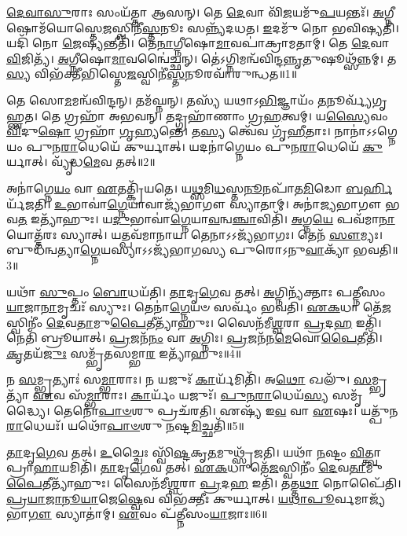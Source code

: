 \setcounter{anuvakam}{0}

\-\ul{𑌦𑍇}\-\-\ul{𑌵𑌾}\-\-\ul{𑌸𑍁}\-𑌰𑌾𑌃 𑌸𑌂𑌯᳴𑌤𑍍𑌤𑌾 𑌆𑌸𑌨𑍍।
𑌤𑍇 \ul{𑌦𑍇}\-𑌵𑌾 𑌵𑌿᳴\-\ul{𑌜}\-𑌯𑌮𑍁᳴\-\ul{𑌪}\-𑌯𑌨𑍍𑌤𑌃᳴।
\-\ul{𑌅}\-𑌗𑍍𑌨𑍀𑌷𑍋𑌮᳴𑌯𑍋𑌸𑍍𑌤𑍇\-\ul{𑌜}\-𑌸𑍍𑌵𑌿𑌨𑍀॑\-\ul{𑌸𑍍𑌤}\-𑌨𑍂𑌃 𑌸𑌨𑍍𑌨𑍍𑌯᳴𑌦𑌧𑌤।
\-\ul{𑌇}\-𑌦𑌮𑍁᳴ 𑌨𑍋 𑌭𑌵𑌿𑌷𑍍𑌯𑌤𑌿।
𑌯𑌦𑌿᳴ 𑌨𑍋 \ul{𑌜𑍇}\-𑌷𑍍𑌯𑌨𑍍𑌤𑍀𑌤𑌿᳴।
𑌤𑍇\-\ul{𑌨𑌾}\-𑌗𑍍𑌨𑍀𑌷𑍋\-\ul{𑌮𑌾}\-𑌵𑌪𑌾॑𑌕𑍍𑌰𑌾𑌮𑌤𑌾𑌮𑍍।
𑌤𑍇 \ul{𑌦𑍇}\-𑌵𑌾 \ul{𑌵𑌿}\-𑌜𑌿𑌤𑍍𑌯᳴।
\-\ul{𑌅}\-𑌗𑍍𑌨𑍀𑌷𑍋\-\ul{𑌮𑌾}\-𑌵𑌨𑍍𑌵𑍈॑𑌚𑍍𑌛𑌨𑍍।
𑌤𑍇॑𑌽𑌗𑍍𑌨𑌿𑌮𑌨𑍍𑌵᳴\-𑌵𑌿𑌨𑍍𑌦\-\ul{𑌨𑍍𑌨𑍃}\-𑌤𑍁𑌷𑍂𑌥𑍍𑌸᳴𑌨𑍍𑌨𑌮𑍍।
𑌤\-\ul{𑌸𑍍𑌯} 𑌵𑌿𑌭᳴𑌕𑍍𑌤𑍀𑌭𑌿𑌸𑍍𑌤𑍇\-\ul{𑌜}\-𑌸𑍍𑌵𑌿𑌨𑍀॑\-\ul{𑌸𑍍𑌤}\-𑌨𑍂\-𑌰𑌵𑌾᳴𑌰𑍁𑌨𑍍𑌧𑌤॥1॥

𑌤𑍇 𑌸𑍋\-\ul{𑌮}\-𑌮𑌨𑍍𑌵᳴𑌵𑌿𑌨𑍍𑌦𑌨𑍍।
𑌤𑌮᳴𑌘𑍍𑌨𑌨𑍍।
𑌤𑌸𑍍𑌯᳴ 𑌯𑌥𑌾\-𑌽\-\ul{𑌭𑌿}\-𑌜𑍍𑌞𑌾𑌯𑌂᳴ \ul{𑌤}\-𑌨𑍂𑌰𑍍𑌵𑍍𑌯᳴𑌗𑍃𑌹𑍍𑌣𑌤।
𑌤𑍇 𑌗𑍍𑌰𑌹𑌾᳴ 𑌅𑌭𑌵𑌨𑍍।
𑌤𑌦𑍍𑌗𑍍𑌰𑌹𑌾᳴𑌣𑌾𑌂 𑌗𑍍𑌰\-\ul{𑌹}\-𑌤𑍍𑌵𑌮𑍍।
𑌯\-\ul{𑌸𑍍𑌯𑍈}\-𑌵𑌂 \ul{𑌵𑌿}\-𑌦𑍁\-\ul{𑌷𑍋} 𑌗𑍍𑌰𑌹𑌾᳴ \ul{𑌗𑍃}\-𑌹𑍍𑌯𑌨𑍍𑌤𑍇॑।
𑌤\-\ul{𑌸𑍍𑌯} 𑌤𑍍𑌵𑍇᳴𑌵 𑌗𑍃᳴\-\ul{𑌹𑍀}\-𑌤𑌾𑌃।
𑌨𑌾𑌨𑌾॑\-𑌽𑌽𑌗𑍍𑌨𑍇𑌯𑌂 𑌪𑍁𑌨\-\ul{𑌰𑌾}\-𑌧𑍇𑌯𑍇᳴ 𑌕𑍁𑌰𑍍𑌯𑌾𑌤𑍍।
𑌯𑌦𑌨𑌾॑𑌗𑍍𑌨𑍇𑌯𑌂 𑌪𑍁𑌨\-\ul{𑌰𑌾}\-𑌧𑍇𑌯𑍇᳴ \ul{𑌕𑍁}\-𑌰𑍍𑌯𑌾𑌤𑍍।
𑌵𑍍𑌯𑍃᳴𑌦𑍍𑌧\-\ul{𑌮𑍇}\-𑌵 𑌤𑌤𑍍॥2॥

𑌅𑌨𑌾॑𑌗𑍍𑌨𑍇\-\ul{𑌯𑌂} 𑌵𑌾 \ul{𑌏}\-𑌤𑌤𑍍𑌕𑍍𑌰𑌿᳴𑌯𑌤𑍇।
𑌯\-\ul{𑌥𑍍𑌸}\-𑌮𑌿\-\ul{𑌧}\-𑌸𑍍𑌤\-\ul{𑌨𑍂}\-𑌨𑌪𑌾᳴𑌤\-\ul{𑌮𑌿}\-𑌡𑍋 \ul{𑌬}\-\-\ul{𑌰𑍍}\-\mbox{}𑌹𑌿𑌰𑍍𑌯᳴𑌜𑌤𑌿।
\-\ul{𑌉}\-𑌭𑌾𑌵𑌾॑\-\ul{𑌗𑍍𑌨𑍇}\-𑌯𑌾𑌵𑌾𑌜𑍍𑌯᳴𑌭𑌾𑌗𑍗 𑌸𑍍𑌯𑌾𑌤𑌾𑌮𑍍।
𑌅𑌨𑌾॑𑌜𑍍𑌯𑌭𑌾𑌗𑍗 𑌭𑌵\-\ul{𑌤} 𑌇𑌤𑍍𑌯𑌾᳴𑌹𑍁𑌃।
𑌯\-\ul{𑌦𑍁}\-𑌭𑌾𑌵𑌾॑\-\ul{𑌗𑍍𑌨𑍇}\-𑌯𑌾\-\ul{𑌵}\-𑌨𑍍𑌵\-\ul{𑌞𑍍𑌚𑌾}\-𑌵𑌿𑌤𑌿᳴।
\-\ul{𑌅}\-𑌗𑍍𑌨\-\ul{𑌯𑍇} 𑌪𑌵᳴𑌮𑌾\-\ul{𑌨𑌾}\-𑌯𑍋𑌤𑍍𑌤᳴𑌰𑌃 𑌸𑍍𑌯𑌾𑌤𑍍।
𑌯𑌤𑍍𑌪𑌵᳴𑌮𑌾𑌨𑌾𑌯।
𑌤𑍇𑌨𑌾𑌽𑌽𑌜𑍍𑌯᳴𑌭𑌾𑌗𑌃।
𑌤𑍇𑌨᳴ \ul{𑌸𑍗}\-𑌮𑍍𑌯𑌃।
𑌬𑍁𑌧᳴𑌨𑍍𑌵𑌤𑍍𑌯𑌾\-\ul{𑌗𑍍𑌨𑍇}\-𑌯𑌸𑍍𑌯𑌾𑌽𑌽𑌜𑍍𑌯᳴𑌭𑌾𑌗𑌸𑍍𑌯 𑌪𑍁𑌰𑍋\-𑌽𑌨𑍁\-\ul{𑌵𑌾}\-𑌕𑍍𑌯𑌾᳴ 𑌭𑌵𑌤𑌿॥3॥

𑌯𑌥𑌾᳴ \ul{𑌸𑍁}\-𑌪𑍍𑌤𑌂 \ul{𑌬𑍋}\-𑌧𑌯᳴𑌤𑌿।
\-\ul{𑌤𑌾}\-𑌦𑍃\-\ul{𑌗𑍇}\-𑌵 𑌤𑌤𑍍।
\-\ul{𑌅}\-𑌗𑍍𑌨𑌿𑌨𑍍𑌯᳴𑌕𑍍𑌤𑌾𑌃 𑌪𑌤𑍍𑌨𑍀𑌸𑌂\-\ul{𑌯𑌾}\-𑌜𑌾\-\ul{𑌨𑌾}\-𑌮𑍃𑌚𑌃᳴ 𑌸𑍍𑌯𑍁𑌃।
𑌤𑍇𑌨𑌾॑\-\ul{𑌗𑍍𑌨𑍇}\-𑌯𑍞 𑌸𑌰𑍍𑌵𑌂᳴ 𑌭𑌵𑌤𑌿।
\-\ul{𑌏}\-\-\ul{𑌕}\-𑌧𑌾 𑌤𑍇᳴\-\ul{𑌜}\-𑌸𑍍𑌵𑌿𑌨𑍀𑌂॑ \ul{𑌦𑍇}\-𑌵\-\ul{𑌤𑌾}\-𑌮𑍁\-\ul{𑌪𑍈}\-𑌤𑍀𑌤𑍍𑌯𑌾᳴𑌹𑍁𑌃।
𑌸𑍈𑌨᳴𑌮𑍀\-\ul{𑌶𑍍𑌵}\-𑌰𑌾 \ul{𑌪𑍍𑌰}\-𑌦\-\ul{𑌹} 𑌇𑌤𑌿᳴।
𑌨𑍇𑌤𑌿᳴ 𑌬𑍍𑌰𑍂𑌯𑌾𑌤𑍍।
\-\ul{𑌪𑍍𑌰}\-𑌜𑌨᳴\-\ul{𑌨𑌂} 𑌵𑌾 \ul{𑌅}\-𑌗𑍍𑌨𑌿𑌃।
\-\ul{𑌪𑍍𑌰}\-𑌜𑌨᳴𑌨\-\ul{𑌮𑍇}\-𑌵𑍋\-\ul{𑌪𑍈}\-𑌤𑍀𑌤𑌿᳴।
\-\ul{𑌕𑍃}\-𑌤𑌯᳴\-\ul{𑌜𑍁𑌃} 𑌸𑌮𑍍𑌭𑍃᳴𑌤𑌸𑌮𑍍𑌭𑌾\-\ul{𑌰} 𑌇𑌤𑍍𑌯𑌾᳴𑌹𑍁𑌃॥4॥

𑌨 \ul{𑌸}\-𑌮𑍍𑌭𑍃𑌤𑍍𑌯𑌾𑌃॑ 𑌸\-\ul{𑌮𑍍𑌭𑌾}\-𑌰𑌾𑌃।
𑌨 𑌯𑌜𑍁𑌃᳴ \ul{𑌕𑌾}\-𑌰𑍍𑌯᳴𑌮𑌿𑌤𑌿᳴।
𑌅\-\ul{𑌥𑍋} 𑌖𑌲𑍁᳴।
\-\ul{𑌸}\-𑌮𑍍𑌭𑍃𑌤𑍍𑌯𑌾᳴ \ul{𑌏}\-𑌵 𑌸᳴\-\ul{𑌮𑍍𑌭𑌾}\-𑌰𑌾𑌃।
\-\ul{𑌕𑌾}\-𑌰𑍍𑌯𑌂᳴ 𑌯𑌜𑍁𑌃᳴।
\-\ul{𑌪𑍁}\-\-\ul{𑌨}\-\-\ul{𑌰𑌾}\-𑌧𑍇𑌯᳴\-\ul{𑌸𑍍𑌯} 𑌸𑌮𑍃᳴𑌦𑍍𑌧𑍍𑌯𑍈।
𑌤𑍇𑌨𑍋᳴\-\ul{𑌪𑌾}\-\-\ul{𑍞}\-𑌶𑍁 𑌪𑍍𑌰𑌚᳴𑌰𑌤𑌿।
𑌏𑌷𑍍𑌯᳴ 𑌇\-\ul{𑌵} 𑌵𑌾 \ul{𑌏}\-𑌷𑌃।
𑌯𑌤𑍍𑌪𑍁᳴𑌨\-\ul{𑌰𑌾}\-𑌧𑍇𑌯𑌃᳴।
𑌯𑌥𑍋᳴\-\ul{𑌪𑌾}\-\-\ul{𑍞}\-𑌶𑍁 \ul{𑌨}\-𑌷𑍍𑌟\-\ul{𑌮𑌿}\-𑌚𑍍𑌛𑌤𑌿᳴॥5॥

\-\ul{𑌤𑌾}\-𑌦𑍃\-\ul{𑌗𑍇}\-𑌵 𑌤𑌤𑍍।
\-\ul{𑌉}\-𑌚𑍍𑌚𑍈𑌃 𑌸𑍍𑌵𑌿᳴\-\ul{𑌷𑍍𑌟}\-𑌕𑍃\-\ul{𑌤}\-𑌮𑍁𑌥𑍍𑌸𑍃᳴𑌜𑌤𑌿।
𑌯𑌥𑌾᳴ \ul{𑌨}\-𑌷𑍍𑌟𑌂 \ul{𑌵𑌿}\-𑌤𑍍𑌤𑍍𑌵𑌾 𑌪𑍍𑌰𑌾\-\ul{𑌹𑌾}\-𑌯𑌮𑌿𑌤𑌿᳴।
\-\ul{𑌤𑌾}\-𑌦𑍃\-\ul{𑌗𑍇}\-𑌵 𑌤𑌤𑍍।
\-\ul{𑌏}\-\-\ul{𑌕}\-𑌧𑌾 𑌤𑍇᳴\-\ul{𑌜}\-𑌸𑍍𑌵𑌿𑌨𑍀𑌂॑ \ul{𑌦𑍇}\-𑌵\-\ul{𑌤𑌾}\-𑌮𑍁\-\ul{𑌪𑍈}\-𑌤𑍀𑌤𑍍𑌯𑌾᳴𑌹𑍁𑌃।
𑌸𑍈𑌨᳴𑌮𑍀\-\ul{𑌶𑍍𑌵}\-𑌰𑌾 \ul{𑌪𑍍𑌰}\-𑌦\-\ul{𑌹} 𑌇𑌤𑌿᳴।
𑌤𑌤𑍍𑌤\-\ul{𑌥𑌾} 𑌨𑍋𑌪𑍈᳴𑌤𑌿।
\-\ul{𑌪𑍍𑌰}\-\-\ul{𑌯𑌾}\-\-\ul{𑌜𑌾}\-\-\ul{𑌨𑍂}\-\-\ul{𑌯𑌾}\-𑌜𑍇\-\ul{𑌷𑍍𑌵𑍇}\-𑌵 𑌵𑌿𑌭᳴𑌕𑍍𑌤𑍀𑌃 𑌕𑍁𑌰𑍍𑌯𑌾𑌤𑍍।
\-\ul{𑌯}\-\-\ul{𑌥𑌾}\-\-\ul{𑌪𑍂}\-𑌰𑍍𑌵𑌮𑌾𑌜𑍍𑌯᳴𑌭𑌾\-\ul{𑌗𑍗} 𑌸𑍍𑌯𑌾𑌤𑌾॑𑌮𑍍।
\-\ul{𑌏}\-𑌵𑌂 𑌪᳴𑌤𑍍𑌨𑍀𑌸𑌂\-\ul{𑌯𑌾}\-𑌜𑌾𑌃॥6॥

